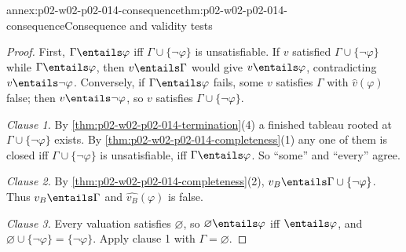 \begin{annexitem}{annex:p02-w02-p02-014-consequence}{thm:p02-w02-p02-014-consequence}{Consequence and validity tests}
\begin{proof}
First, \(\Gamma\entails\varphi\) iff \(\Gamma\cup\{\neg\varphi\}\) is
unsatisfiable.  If \(v\) satisfied \(\Gamma\cup\{\neg\varphi\}\) while
\(\Gamma\entails\varphi\), then \(v\entails\Gamma\) would give
\(v\entails\varphi\), contradicting \(v\entails\neg\varphi\).  Conversely, if
\(\Gamma\entails\varphi\) fails, some \(v\) satisfies \(\Gamma\) with
\(\widehat v(\varphi)\) false; then \(v\entails\neg\varphi\), so \(v\)
satisfies \(\Gamma\cup\{\neg\varphi\}\).

\emph{Clause 1.}  By \cref{thm:p02-w02-p02-014-termination}(4) a finished
tableau rooted at \(\Gamma\cup\{\neg\varphi\}\) exists.  By
\cref{thm:p02-w02-p02-014-completeness}(1) any one of them is closed iff
\(\Gamma\cup\{\neg\varphi\}\) is unsatisfiable, iff
\(\Gamma\entails\varphi\).  So ``some'' and ``every'' agree.

\emph{Clause 2.}  By \cref{thm:p02-w02-p02-014-completeness}(2),
\(v_B\entails\Gamma\cup\{\neg\varphi\}\).  Thus \(v_B\entails\Gamma\) and
\(\widehat{v_B}(\varphi)\) is false.

\emph{Clause 3.}  Every valuation satisfies \(\varnothing\), so
\(\varnothing\entails\varphi\) iff \(\entails\varphi\), and
\(\varnothing\cup\{\neg\varphi\}=\{\neg\varphi\}\).  Apply clause 1 with
\(\Gamma=\varnothing\).
\end{proof}
\end{annexitem}

